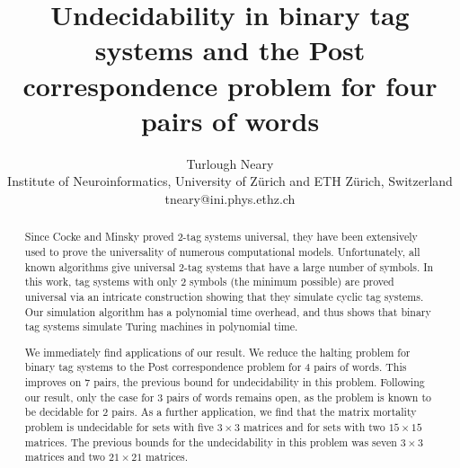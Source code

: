 \documentclass[11pt]{article} \usepackage{amsfonts,amsmath,amssymb,amsthm}
\begin{document}
\title{Undecidability in binary tag systems and the Post correspondence problem for four pairs of words}

\author{Turlough Neary\\
Institute of Neuroinformatics, University of Z\"urich and ETH Z\"urich, Switzerland\\
tneary@ini.phys.ethz.ch
}
\date{}
\maketitle

\begin{abstract}
Since Cocke and Minsky proved 2-tag systems universal, they have been extensively used to prove the universality of numerous computational models. Unfortunately, all known algorithms give universal 2-tag systems that have a large number of symbols. 
In this work, tag systems with only 2 symbols (the minimum possible) are proved universal via an intricate construction showing that they simulate cyclic tag systems. 
Our simulation algorithm has a polynomial time overhead, and thus shows that binary tag systems simulate Turing machines in polynomial time. 

We immediately find applications of our result. 
We reduce the halting problem for binary tag systems to the Post correspondence problem for 4 pairs of words.
This improves on 7 pairs, the previous bound for undecidability in this problem.
Following our result, only the case for 3 pairs of words remains open, as the problem is known to be decidable for 2 pairs. 
As a further application, we find that the matrix mortality problem is undecidable for sets with five $3\times 3$ matrices and for sets with two $15\times 15$ matrices. 
The previous bounds for the undecidability in this problem was seven $3\times 3$ matrices and two $ 21\times 21$ matrices.  
\end{abstract}
\end{document}

